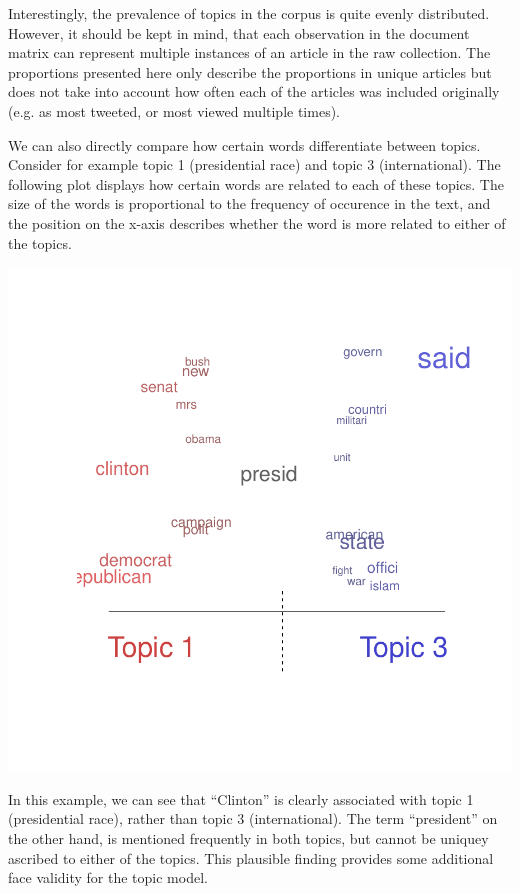 \documentclass[12pt]{article}\usepackage[]{graphicx}\usepackage[]{color}
\makeatletter
\def\maxwidth{ %
  \ifdim\Gin@nat@width>\linewidth
    \linewidth
  \else
    \Gin@nat@width
  \fi
}
\newenvironment{knitrout}{}{} %
\makeatother
\begin{document}
Interestingly, the prevalence of topics in the corpus is quite evenly distributed. However, it should be kept in mind, that each observation in the document matrix can represent multiple instances of an article in the raw collection. The proportions presented here only describe the proportions in unique articles but does not take into account how often each of the articles was included originally (e.g. as most tweeted, or most viewed multiple times). 

We can also directly compare how certain words differentiate between topics. Consider for example topic 1 (presidential race) and topic 3 (international). The following plot displays how certain words are related to each of these topics. The size of the words is proportional to the frequency of occurence in the text, and the position on the x-axis describes whether the word is more related to either of the topics.

\begin{knitrout}
\color{fgcolor}
\includegraphics[width=\maxwidth]{figure/unnamed-chunk-6-1} 

\end{knitrout}

In this example, we can see that ``Clinton'' is clearly associated with topic 1 (presidential race), rather than topic 3 (international). The term ``president'' on the other hand, is mentioned frequently in both topics, but cannot be uniquey ascribed to either of the topics. This plausible finding provides some additional face validity for the topic model.
\end{document}
